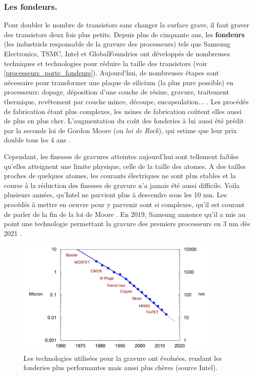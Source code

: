 \subsubsection{Les fondeurs.}
Pour doubler le nombre de transistors sans changer la surface grave, il faut graver des transistors deux fois plus petits. 
Depuis plus de cinquante ans, les \textbf{fondeurs} (les industriels responsable de la gravure des processeurs) tels que Samsung Electronics, TSMC, Intel et GlobalFoundries ont développés de nombreuses techniques et technologies pour réduire la taille des transistors (voir \autoref{processeurs_porte_fondeurs}). Aujourd'hui, de nombreuses étapes sont nécessaire pour transformer une plaque de silicium (la plus pure possible) en processeurs: dopage, déposition d'une couche de résine, gravure, traitement thermique, revêtement par couche mince, découpe, encapsulation... \cite{AnthonyNelzinSantos2018}.
Les procédés de fabrication étant plus complexes, les usines de fabrication coûtent elles aussi de plus en plus cher. L'augmentation du coût des fonderies à lui aussi été prédit par la seconde loi de Gordon Moore (ou \textit{loi de Rock}), qui estime que leur prix double tous les 4 ans \cite{schaller1997moore}.


Cependant, les finesses de gravures atteintes aujourd'hui sont tellement faibles qu'elles atteignent une limite physique, celle de la taille des atomes. A des tailles proches de quelques atomes, les courants électriques ne sont plus stables et la course à la réduction des finesses de gravure n'a jamais été aussi difficile.
Voila plusieurs années, qu'Intel ne parvient plus à descendre sous les 10 nm. Les procédés à mettre en oeuvre pour y parvenir sont si complexes, qu'il est courant de parler de la fin de la loi de Moore \cite{theis2017end}.
En 2019, Samsung annonce qu'il a mis au point une technologie permettant la gravure des premiers processeurs en 3 nm dès 2021 \cite{AdrianBRANCO2019}. 


\begin{figure}
    \center
    \includegraphics[width=10cm]{images/processeurs_porte_fondeurs.png}
    \caption{\label{processeurs_porte_fondeurs} Les technologies utilisées pour la gravure ont évoluées, rendant les fonderies plus performantes mais aussi plus chères (source Intel).}
\end{figure}













